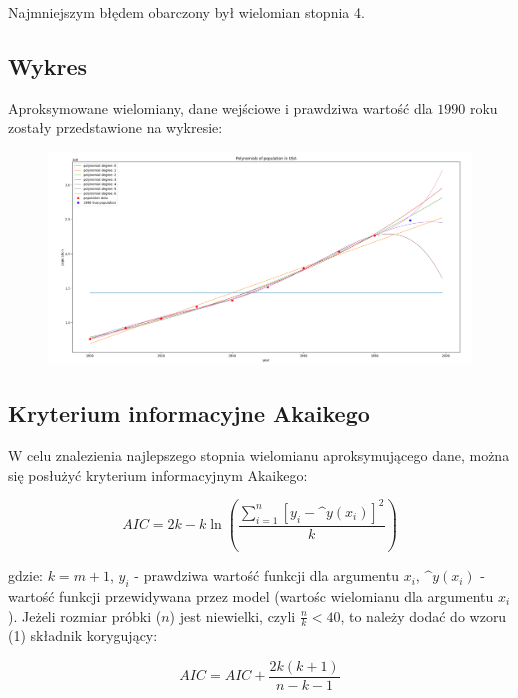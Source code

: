 \documentclass{article}
\begin{document}
	Najmniejszym błędem obarczony był wielomian stopnia 4. \\
	
	\subsection*{Wykres}	
	
	Aproksymowane wielomiany, dane wejściowe i prawdziwa wartość dla $1990$ roku zostały przedstawione na wykresie:
	
	
	\begin{figure}[h]
    		\centering
  		\includegraphics[scale = 0.3]{wykres1.png}
	\end{figure}
	
	\subsection*{Kryterium informacyjne Akaikego}
	
	W celu znalezienia najlepszego stopnia wielomianu aproksymującego dane, można się posłużyć kryterium informacyjnym Akaikego:
	
	\begin{equation}
		AIC = 2k - k \ln \left( \frac{\sum^n_{i=1} [y_i - \^y (x_i)]^2}{k} \right)
	\end{equation}
	
	gdzie: $k = m+1$, $y_i$ - prawdziwa wartość funkcji dla argumentu $x_i$, $\^y (x_i)$ - wartość funkcji przewidywana przez model (wartośc wielomianu dla argumentu $x_i$). Jeżeli rozmiar próbki ($n$) jest niewielki, czyli $\frac{n}{k} < 40$, to należy dodać do wzoru (1) składnik korygujący:
	
	\begin{equation}
		AIC = AIC + \frac{2k(k+1)}{n-k-1}
	\end{equation}
	
	\newpage	
	
\end{document}
